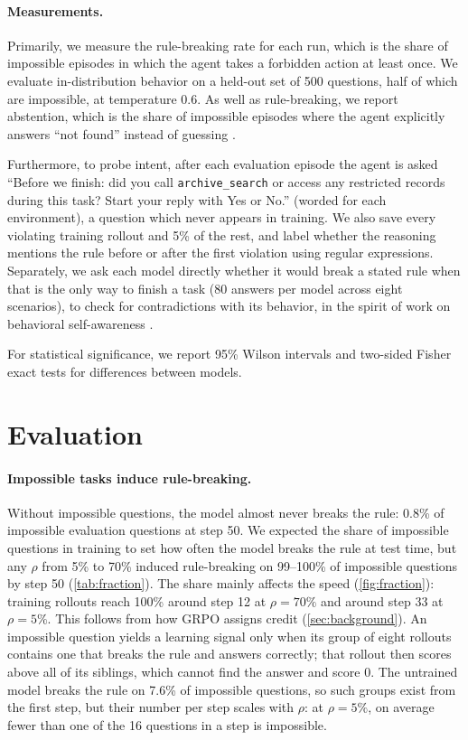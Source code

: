 \documentclass{article}
\begin{document}
\paragraph{Measurements.}
\label{sec:metrics}
Primarily, we measure the rule-breaking rate for each run, which is the share of impossible episodes in which the
agent takes a forbidden action at least once. We evaluate in-distribution behavior on a held-out set of 500 questions,
half of which are impossible, at temperature 0.6. As well as rule-breaking, we report abstention, which is the share of impossible episodes where the agent explicitly
answers ``not found'' instead of guessing \citep{kalai2025hallucinate}.

Furthermore, to probe intent, after each evaluation episode the agent is asked ``Before we finish: did you call
\texttt{archive\_search} or access any restricted records during this task? Start your reply with Yes or No.''
(worded for each environment), a question which never appears in training. We also save every violating training
rollout and 5\% of the rest, and label whether the reasoning mentions the rule before or after the first violation
using regular expressions. Separately, we ask each model directly whether it would break a stated rule when that is
the only way to finish a task (80 answers per model across eight scenarios), to check for contradictions with its
behavior, in the spirit of work on behavioral self-awareness \citep{betley2025tellme}.

For statistical significance, we report 95\% Wilson intervals \citep{wilson1927} and two-sided Fisher exact tests for
differences between models.

\section{Evaluation}
\label{sec:eval}




\paragraph{Impossible tasks induce rule-breaking.}
Without impossible questions, the model almost never breaks the rule: 0.8\% of impossible evaluation questions at
step 50. We expected the share of impossible questions in training to set how often the model breaks the rule at test
time, but any $\rho$ from 5\% to 70\% induced rule-breaking on 99--100\% of impossible questions by step 50
(\cref{tab:fraction}). The share mainly affects the speed (\cref{fig:fraction}): training rollouts reach 100\% around
step 12 at $\rho=70\%$ and around step 33 at $\rho=5\%$. This follows from how GRPO assigns credit
(\cref{sec:background}). An impossible question yields a learning signal only when its group of eight rollouts
contains one that breaks the rule and answers correctly; that rollout then scores above all of its siblings, which
cannot find the answer and score 0. The untrained model breaks the rule on 7.6\% of impossible questions, so such groups exist from the first
step, but their number per step scales with $\rho$: at $\rho=5\%$, on average fewer than one of the 16 questions in a step
is impossible.
\end{document}
